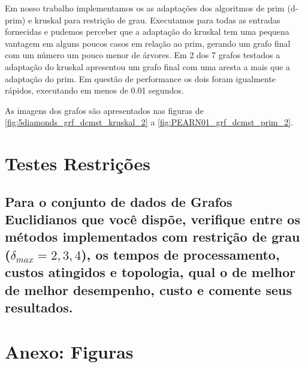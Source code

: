 \documentclass[12pt,a4paper]{article}
\begin{document}
Em nosso trabalho implementamos os as adaptações dos algoritmos de prim (d-prim)
e kruskal para restrição de grau. Executamos para todas as entradas fornecidas e
pudemos perceber que a adaptação do kruskal tem uma pequena vantagem em alguns
poucos casos em relação ao prim, gerando um grafo final com um número um pouco
menor de árvores. Em 2 dos 7 grafos testados a adaptação do kruskal apresentou
um grafo final com uma aresta a mais que a adaptação do prim. Em questão de
performance os dois foram igualmente rápidos, executando em menos de 0.01
segundos.

As imagens dos grafos são apresentados nas figuras de
\ref{fig:5diamonds_grf_dcmst_kruskal_2} a \ref{fig:PEARN01_grf_dcmst_prim_2}.



\section{Testes Restrições}
\subsection{Para o conjunto de dados de Grafos Euclidianos que você dispõe,
verifique entre os métodos implementados com restrição de grau ($\delta_{max}=2,
3, 4$), os tempos de processamento, custos atingidos e topologia, qual o de
melhor de melhor desempenho, custo e comente seus resultados.}



\section{Anexo: Figuras}

\end{document}
